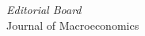\documentclass[foldmarks=false, backaddress=off,fromemail,firstfoot=true,12pt]{scrlttr2}
\begin{document}
\begin{letter}{{\it Editorial Board} \\ Journal of Macroeconomics}
%
%
%
%
\end{letter}
\end{document}
